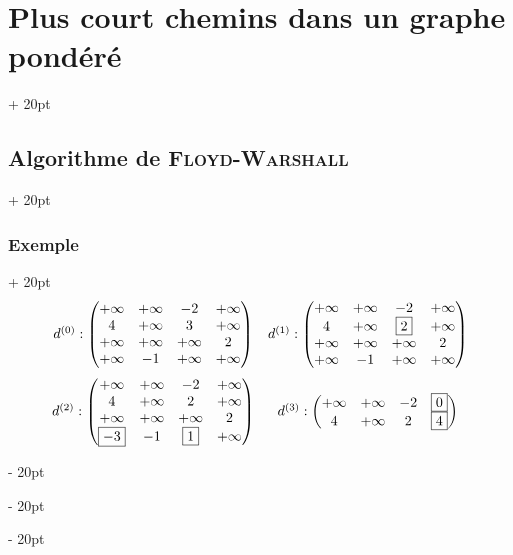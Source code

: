 \documentclass[a4paper, 12pt, twoside]{article}
\newcommand{\ind}[1][20pt]{\advance\leftskip + #1}
\newcommand{\deind}[1][20pt]{\advance\leftskip - #1}
\newenvironment{indt}[2][20pt]{#2 \par \ind[#1]}{\par \deind} %
\begin{document}
\begin{indt}{\section{Plus court chemins dans un graphe pondéré}}
\begin{indt}{\subsection{Algorithme de \textsc{Floyd-Warshall}}}
\begin{indt}{\subsubsection{Exemple}}
                \[
                    \begin{array}{cc}
                        d^{(0)} :
                        \begin{pmatrix}
                            +\infty & +\infty & -2 & +\infty
                            \\
                            4 & +\infty & 3 & +\infty
                            \\
                            +\infty & +\infty & +\infty & 2
                            \\
                            +\infty & -1 & +\infty & +\infty
                        \end{pmatrix}
                        &
                        d^{(1)} :
                        \begin{pmatrix}
                            +\infty & +\infty & -2 & +\infty
                            \\
                            4 & +\infty & \boxed{2} & +\infty
                            \\
                            +\infty & +\infty & +\infty & 2
                            \\
                            +\infty & -1 & +\infty & +\infty
                        \end{pmatrix}
                        \vspace{6pt}
                        \\
                        d^{(2)} :
                        \begin{pmatrix}
                            +\infty & +\infty & -2 & +\infty
                            \\
                            4 & +\infty & 2 & +\infty
                            \\
                            +\infty & +\infty & +\infty & 2
                            \\
                            \boxed{-3} & -1 & \boxed{1} & +\infty
                        \end{pmatrix}
                        &
                        d^{(3)} :
                        \begin{pmatrix}
                            +\infty & +\infty & -2 & \boxed 0
                            \\
                            4 & +\infty & 2 & \boxed 4
                            \\

\end{pmatrix}
\end{array}\]
\end{indt}
\end{indt}
\end{indt}
\end{document}
